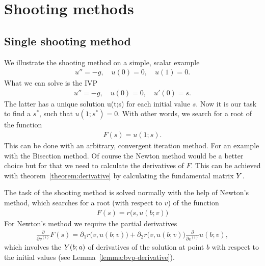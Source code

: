 \section{Shooting methods}
\subsection{Single shooting method}

\begin{example}
  We illustrate the shooting method on a simple, scalar example
  \begin{gather*}
    u'' = -g, \quad u(0) = 0, \quad u(1) = 0.
  \end{gather*}
	What we can solve is the IVP
  \begin{gather*}
    u'' = -g, \quad u(0) = 0, \quad u'(0) = s.
  \end{gather*}
	The latter has a unique solution u(t;s) for each initial value
  $s$. Now it is our task to find a $s^*$, such that
  $u(1;s^*) = 0$. With other words, we search for a root of the function
  \begin{gather*}  
    F(s) = u(1;s).
  \end{gather*}
  This can be done with an arbitrary, convergent iteration method.
  For an example with the Bisection method.  Of course the Newton
  method would be a better choice but for that we need to calculate
  the derivatives of $F$.  This can be achieved with
  theorem~\ref{theorem:derivative} by calculating the
  fundamental matrix $Y$.
\end{example}



\begin{remark}
  The task of the shooting method is solved normally with the help of
  Newton's method, which searches for a root (with respect to $v$) of
  the function
  \begin{gather}
    \label{eq:rwa:11}
    F(s) = r\bigl(s, u(b;v)\bigr)
  \end{gather}
	For Newton's method we require the partial derivatives
  \begin{gather*}
    \frac\partial{\partial v^{(i)}} F(s) =
    \partial_1 r\bigr(v,u(b;v)\bigr)
    + \partial_2r\bigr(v,u(b;v)\bigr) \frac\partial{\partial v^{(i)}} u(b;v),
  \end{gather*}
  which involves the  $\fundamental(b;a)$
  of derivatives of the solution at point $b$ with respect to the
  initial values (see Lemma~\ref{lemma:bvp-derivative}).
\end{remark}

